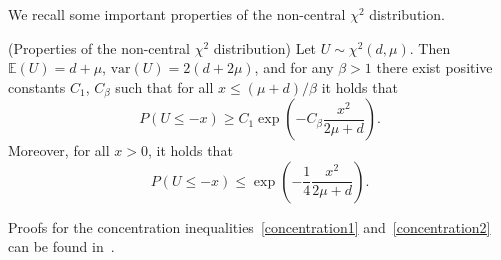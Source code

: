 We recall some important properties of the non-central $\chi^2$ distribution.
\begin{property}{(Properties of the non-central $\chi^2$ distribution)}
\label{ppty:ncchi^2}
Let $U\sim \chi^2(d,\mu)$. Then $\mathbb{E}(U)=d+\mu$, $\text{var}(U) = 2(d+2\mu)$, and for any $\beta>1$ there exist positive constants $C_1$, $C_{\beta}$ such that for all $x\leq (\mu+d)/\beta$ it holds that 
\begin{equation}
\label{concentration1}
P\left(U\leq -x\right) \geq C_1 \exp{\left(-C_\beta \frac{x^2}{2\mu+d}\right)}.
\end{equation}
Moreover, for all $x>0$, it holds that 
\begin{equation}
    \label{concentration2}
P\left(U\leq -x\right) \leq \exp{\left(-\frac14 \frac{x^2}{2\mu+d}\right)}.
\end{equation}
\end{property}
Proofs for the concentration inequalities~\ref{concentration1} and~\ref{concentration2} can be found in~\cite[Theorem~7]{chi2magical}. 
